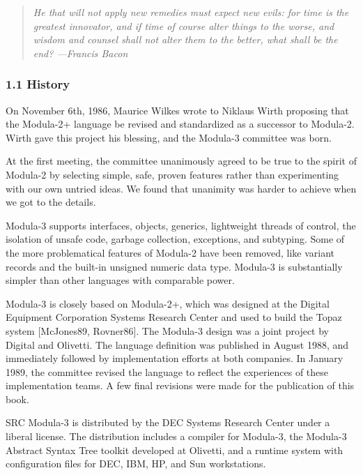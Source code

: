 \documentclass[10pt]{article}
\begin{document}
\begin{quote}
\emph{ He that will not apply new remedies must expect new evils: for time is the greatest innovator, and if time of course alter things to the worse, and wisdom and counsel shall not alter them to the better, what shall be the end? ---Francis Bacon }
\end{quote}


 
\subsubsection*{1.1 History}


  On November 6th, 1986, Maurice Wilkes wrote to Niklaus Wirth proposing that the Modula-2+ language be revised and standardized as a successor to Modula-2. Wirth gave this project his blessing, and the Modula-3 committee was born. 


  At the first meeting, the committee unanimously agreed to be true to the spirit of Modula-2 by selecting simple, safe, proven features rather than experimenting with our own untried ideas. We found that unanimity was harder to achieve when we got to the details. 


 Modula-3 supports interfaces, objects, generics, lightweight threads of control, the isolation of unsafe code, garbage collection, exceptions, and subtyping. Some of the more problematical features of Modula-2 have been removed, like variant records and the built-in unsigned numeric data type. Modula-3 is substantially simpler than other languages with comparable power. 


 Modula-3 is closely based on Modula-2+, which was designed at the Digital Equipment Corporation Systems Research Center and used to build the Topaz system [McJones89, Rovner86]. The Modula-3 design was a joint project by Digital and Olivetti. The language definition was published in August 1988, and immediately followed by implementation efforts at both companies. In January 1989, the committee revised the language to reflect the experiences of these implementation teams. A few final revisions were made for the publication of this book. 


 SRC Modula-3 is distributed by the DEC Systems Research Center under a liberal license. The distribution includes a compiler for Modula-3, the Modula-3 Abstract Syntax Tree toolkit developed at Olivetti, and a runtime system with configuration files for DEC, IBM, HP, and Sun workstations. 
\end{document}
